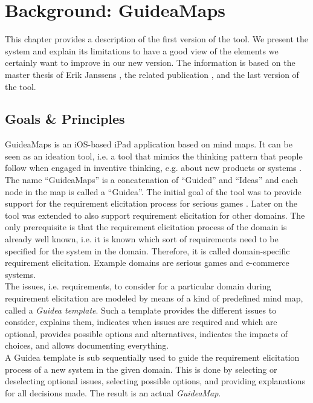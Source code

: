 \chapter{Background: GuideaMaps}\label{ch:background-guideamaps}
This chapter provides a description of the first version of the tool. We present the system and explain its limitations to have a good view of the elements we certainly want to improve in our new version. The information is based on the master thesis of Erik Janssens \citep{erikjanssens}, the related publication \citep{detroyerjanssens}, and the last version of the tool.

\section{Goals \& Principles}
GuideaMaps is an iOS-based iPad application based on mind maps. It can be seen as an ideation tool, i.e. a tool that mimics the thinking pattern that people follow when engaged in inventive thinking, e.g. about new products or systems \citep{goldenberg1999ideation}. The name ``GuideaMaps'' is a concatenation of ``Guided'' and ``Ideas'' and each node in the map is called a ``Guidea''. The initial goal of the tool was to provide support for the requirement elicitation process for serious games \citep{erikjanssens}. Later on the tool was extended to also support requirement elicitation for other domains. The only prerequisite is that the requirement elicitation process of the domain is already well known, i.e. it is known which sort of requirements need to be specified for the system in the domain. Therefore, it is called domain-specific requirement elicitation. Example domains are serious games and e-commerce systems.\\

The issues, i.e. requirements, to consider for a particular domain during requirement elicitation are modeled by means of a kind of predefined mind map, called a \textit{Guidea template}. Such a template provides the different issues to consider, explains them, indicates when issues are required and which are optional, provides possible options and alternatives, indicates the impacts of choices, and allows documenting everything.\\

A Guidea template is sub sequentially used to guide the requirement elicitation process of a new system in the given domain. This is done by selecting or deselecting optional issues, selecting possible options, and providing explanations for all decisions made. The result is an actual \textit{GuideaMap}.\\

